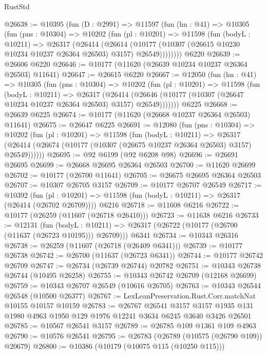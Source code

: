 \begin{lexlean}{RustStd}
\begin{coremodule}
@26638 := @10395
    (fun (D : @2991) =>
    @11597
      (fun (hn : @41) =>
      @10305
        (fun (pns : @10304) =>
        @10202
          (fun (pl : @10201) =>
          @11598
            (fun (bodyL : @10211) =>
            @26317
              (@26414
                (@26614
                  (@10177 (@10307 (@26615 @10230 @10234 @10237 @26364 @26503) @3157) @26549))))))))
    @6220
@26639 := @26606 @6220
@26646 := @10177 (@11620 (@26639 @10234 @10237 @26364 @26503) @11641)
@26647 := @26615 @6220
@26667 := @12050
    (fun (hn : @41) =>
    @10305
      (fun (pns : @10304) =>
      @10202
        (fun (pl : @10201) =>
        @11598
          (fun (bodyL : @10211) =>
          @26317
            (@26414
              (@26646 (@10177 (@10307 (@26647 @10234 @10237 @26364 @26503) @3157) @26549)))))))
    @6225
@26668 := @26639 @6225
@26674 := @10177 (@11620 (@26668 @10237 @26364 @26503) @11641)
@26675 := @26647 @6225
@26691 := @12080
    (fun (pns : @10304) =>
    @10202
      (fun (pl : @10201) =>
      @11598
        (fun (bodyL : @10211) =>
        @26317 (@26414 (@26674 (@10177 (@10307 (@26675 @10237 @26364 @26503) @3157) @26549))))))
@26695 := @92 @6199 (@92 @6208 @98)
@26696 := @26691 @26695
@26699 := @26668 @26695 @26364 @26503
@26700 := @11620 @26699
@26702 := @10177 (@26700 @11641)
@26705 := @26675 @26695 @26364 @26503
@26707 := @10307 @26705 @3157
@26709 := @10177 @26707 @26549
@26717 := @10392
    (fun (pl : @10201) => @11598 (fun (bodyL : @10211) => @26317 (@26414 (@26702 @26709))))
    @6216
@26718 := @11608 @6216
@26722 := @10177 (@26259 (@11607 (@26718 @26410)))
@26723 := @11638 @6216
@26733 := @12131
    (fun (bodyL : @10211) => @26317 (@26722 (@10177 (@26700 (@11637 (@26723 @10195))) @26709)))
    @6341
@26734 := @10343 @26316
@26738 := @26259 (@11607 (@26718 (@26409 @6341)))
@26739 := @10177 @26738
@26742 := @26700 (@11637 (@26723 @6341))
@26744 := @10177 @26742 @26709
@26747 := @26734 (@26739 @26744) @20782
@26751 := @10343 @26738 @26744 (@10495 @26258)
@26755 := @10343 @26742 @26709 (@12168 @26699)
@26759 := @10343 @26707 @26549 (@10616 @26705)
@26763 := @10343 @26544 @26548 (@10500 @26377)
@26767 := LexLeanPreservation.Rust.Corr.matchNat @10155 @10157 @10159
@26783 := @26767
    @26541
    @3157
    @3157
    @1935
    @131
    @1980
    @4963
    @1950
    @129
    @1976
    @12241
    @3634
    @6245
    @3640
    @3426
    @26501
@26785 := @10567 @26541 @3157
@26789 := @26785 @109 @1361 @109 @4963
@26790 := @10576 @26541
@26795 := @26783 (@26789 (@10575 (@26790 @109)) @20679)
@26800 := @10386 (@10179 (@10075 @115 (@10250 @115)))

\end{coremodule}
\end{lexlean}
